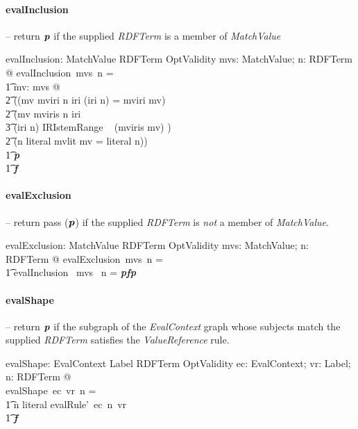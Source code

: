 \documentclass[fuzz]{llncs}
\def\entryFor{\cdot}
\def\pass{\textbf{\textit{p}}}
\def\fail{\textbf{\textit{f}}}
\def\zc{\textit}
\begin{document}
\paragraph{evalInclusion} -- return $\pass$ if the supplied \zc{RDFTerm} is a member of \zc{MatchValue}
\begin{gendef}
   evalInclusion: \power MatchValue \pfun RDFTerm \pfun OptValidity
\where
   \forall mvs: \power MatchValue; n: RDFTerm @ evalInclusion~mvs~n = \\
\t1	\IF \exists mv: mvs @ \\
\t2 ((mv \in \ran mviri \land n \in \ran iri \land (iri \entryFor n) = mviri \entryFor mv) \lor \\
\t2  (mv \in \ran mviris \land n \in \ran iri \land  \\
\t3 (iri \entryFor n) \in IRIstemRange ~ (mviris \entryFor mv) ) \lor \\
\t2  (n \in \ran literal \land mvlit \entryFor mv = literal \entryFor n)) \\
\t1 \THEN \pass \\
\t1 \ELSE \fail
\end{gendef}


\paragraph{evalExclusion} -- return pass ($\pass$) if the supplied \zc{RDFTerm} is \textit{not} a member of \zc{MatchValue}.

\begin{gendef}
   evalExclusion: \power MatchValue \fun RDFTerm \fun OptValidity
\where
   \forall mvs: \power MatchValue; n: RDFTerm @ evalExclusion~mvs~n = \\
\t1 \IF evalInclusion~ mvs~ n = \pass \THEN \fail \ELSE \pass
\end{gendef}

\paragraph{evalShape} -- return $\pass$ if the subgraph of the \zc{EvalContext} graph whose subjects match the supplied \zc{RDFTerm} satisfies the \zc{ValueReference} rule.

\begin{gendef}
   evalShape: EvalContext \pfun Label \pfun RDFTerm \pfun OptValidity
\where
	\forall ec: EvalContext; vr: Label; n: RDFTerm @ \\ evalShape~ec~vr~n = \\
\t1 \IF n \notin \ran literal \THEN evalRule'~ec~n~vr \\
\t1 \ELSE \fail
\end{gendef}
\end{document}
